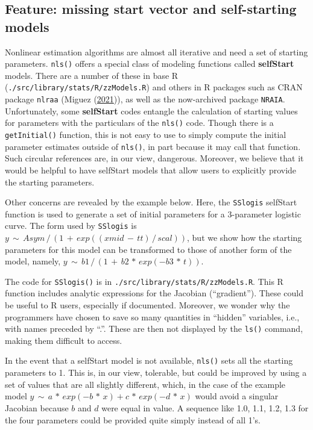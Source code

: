 \documentclass[
]{article}
\begin{document}
\hypertarget{feature-missing-start-vector-and-self-starting-models}{%
\subsection{Feature: missing start vector and self-starting
models}\label{feature-missing-start-vector-and-self-starting-models}}

Nonlinear estimation algorithms are almost all iterative and need a set
of starting parameters. \texttt{nls()} offers a special class of
modeling functions called \textbf{selfStart} models. There are a number
of these in base R (\texttt{./src/library/stats/R/zzModels.R}) and
others in R packages such as CRAN package \texttt{nlraa} (Miguez
(\protect\hyperlink{ref-MiguezNLRAA2021}{2021})), as well as the
now-archived package \texttt{NRAIA}. Unfortunately, some
\textbf{selfStart} codes entangle the calculation of starting values for
parameters with the particulars of the \texttt{nls()} code. Though there
is a \texttt{getInitial()} function, this is not easy to use to simply
compute the initial parameter estimates outside of \texttt{nls()}, in
part because it may call that function. Such circular references are, in
our view, dangerous. Moreover, we believe that it would be helpful to
have selfStart models that allow users to explicitly provide the
starting parameters.

Other concerns are revealed by the example below. Here, the
\texttt{SSlogis} selfStart function is used to generate a set of initial
parameters for a 3-parameter logistic curve. The form used by
\texttt{SSlogis} is
\(y \,\sim\, Asym\,/\, (1 \,+\, exp((xmid\,-\,tt)\,/\,scal))\), but we
show how the starting parameters for this model can be transformed to
those of another form of the model, namely,
\(y \,\sim\, b1\,/\,(1 \,+\, b2\,*\,exp(-b3\,*\,t))\).

The code for \texttt{SSlogis()} is in
\texttt{./src/library/stats/R/zzModels.R}. This R function includes
analytic expressions for the Jacobian (``gradient''). These could be
useful to R users, especially if documented. Moreover, we wonder why the
programmers have chosen to save so many quantities in ``hidden''
variables, i.e., with names preceded by ``.''. These are then not
displayed by the \texttt{ls()} command, making them difficult to access.

In the event that a selfStart model is not available, \texttt{nls()}
sets all the starting parameters to 1. This is, in our view, tolerable,
but could be improved by using a set of values that are all slightly
different, which, in the case of the example model
\(y \,\sim\, a \,*\, exp(-b \,*\, x) + c\,*\,exp(-d \,*\, x)\) would
avoid a singular Jacobian because \(b\) and \(d\) were equal in value. A
sequence like 1.0, 1.1, 1.2, 1.3 for the four parameters could be
provided quite simply instead of all 1's.
\end{document}
